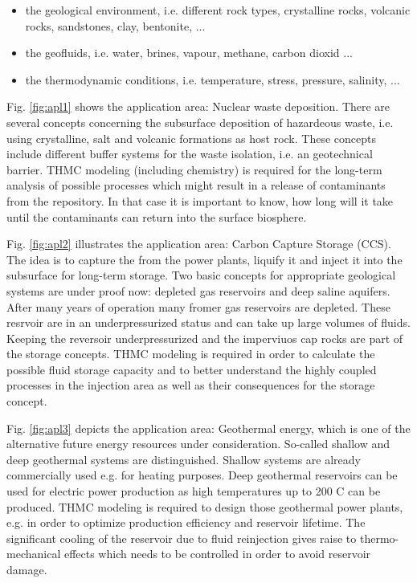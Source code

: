 \begin{itemize}
	\item the geological environment, i.e. different rock types, crystalline rocks, volcanic rocks, sandstones, clay, bentonite, ...
	\item the geofluids, i.e. water, brines, vapour, methane, carbon dioxid ...
	\item the thermodynamic conditions, i.e. temperature, stress, pressure, salinity, ...
\end{itemize}

Fig. \ref{fig:apl1} shows the application area: Nuclear waste deposition.
There are several concepts concerning the subsurface deposition of hazardeous waste, i.e. using crystalline, salt and volcanic formations as host rock. These concepts include different buffer systems for the waste isolation, i.e. an geotechnical barrier. THMC modeling (including chemistry) is required for the long-term analysis of possible processes which might result in a release of contaminants from the repository. In that case it is important to know, how long will it take until the contaminants can return into the surface biosphere.

Fig. \ref{fig:apl2} illustrates the application area: Carbon Capture Storage (CCS). The idea is to capture the  from the power plants, liquify it and inject it into the subsurface for long-term storage. Two basic concepts for appropriate geological systems are under proof now: depleted gas reservoirs and deep saline aquifers. After many years of operation many fromer gas reservoirs are depleted. These resrvoir are in an underpressurized status and can take up large volumes of fluids. Keeping the reversoir underpressurized and the imperviuos cap rocks are part of the storage concepts. 
THMC modeling is required in order to calculate the possible fluid storage capacity and to better understand the highly coupled processes in the  injection area as well as their consequences for the storage concept.

Fig. \ref{fig:apl3} depicts the application area: Geothermal energy, which is one of the alternative future energy resources under consideration. So-called shallow and deep geothermal systems are distinguished. Shallow systems are already commercially used e.g. for heating purposes. Deep geothermal reservoirs can be used for electric power production as high temperatures up to 200 C can be produced. 
THMC modeling is required to design those geothermal power plants, e.g. in order to optimize production efficiency and reservoir lifetime. The significant cooling of the reservoir due to fluid reinjection gives raise to thermo-mechanical effects which needs to be controlled in order to avoid reservoir damage.


